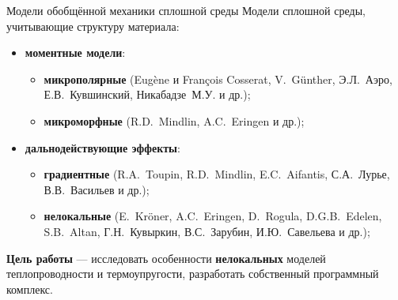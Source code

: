 \begin{frame}{Модели обобщённой механики сплошной среды}
	Модели сплошной среды, учитывающие структуру материала:
	\begin{itemize}
		\item \textbf{моментные модели}:
		\begin{itemize}
			\justifying
			\item \textbf{микрополярные} (Eugène и François Cosserat, V.~G{\"u}nther, Э.Л.~Аэро, Е.В.~Кувшинский, Никабадзе~М.У. и др.);
			\item \textbf{микроморфные} (R.D.~Mindlin, A.C.~Eringen и др.);
		\end{itemize}
		\item \textbf{дальнодействующие эффекты}:
		\begin{itemize}
			\justifying
			\item \textbf{градиентные} (R.A.~Toupin, R.D.~Mindlin, E.C.~Aifantis, С.А.~Лурье, В.В.~Васильев и др.);
			\item \textbf{нелокальные} (E.~Kr{\"o}ner, A.C.~Eringen, D.~Rogula, D.G.B.~Edelen, S.B.~Altan, Г.Н.~Кувыркин, В.С.~Зарубин, И.Ю.~Савельева и др.);
		\end{itemize}
	\end{itemize}
	
	\justifying
	\textbf{Цель работы} --- исследовать особенности \textbf{нелокальных} моделей теплопроводности и термоупругости, разработать собственный программный комплекс.
	

\end{frame}
